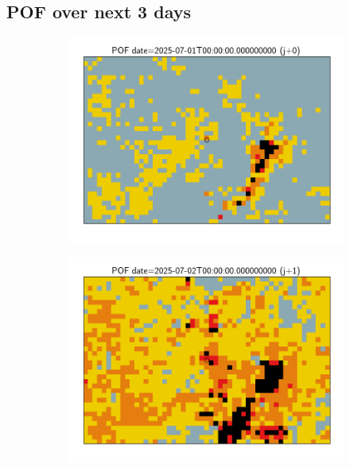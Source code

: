 \documentclass{article}
\begin{document}
\subsection*{POF over next 3 days}
\vspace{-1em}
\begin{figure}[H]
    \centering
    \begin{subfigure}[b]{0.31\textwidth}
        \centering
        \includegraphics[width=\linewidth]{pof_262_j0.png} %
    \end{subfigure}
    \begin{subfigure}[b]{0.31\textwidth}
        \centering
        \includegraphics[width=\linewidth]{pof_262_j1.png} %

\end{subfigure}
\end{figure}
\end{document}

